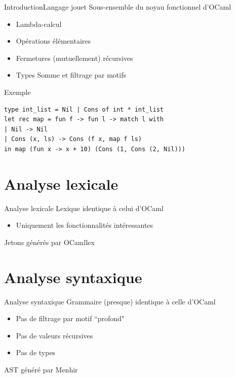 \documentclass{beamer}
\begin{document}
\begin{frame}[fragile]{Introduction}{Langage jouet}
    Sous-ensemble du noyau fonctionnel d'OCaml

    \begin{itemize}
        \item Lambda-calcul
        \item Opérations élémentaires
        \item Fermetures (mutuellement) récursives
        \item Types Somme et filtrage par motifs
    \end{itemize}

    \begin{exampleblock}{Exemple}
        \begin{lstlisting}[language=caml]
type int_list = Nil | Cons of int * int_list
let rec map = fun f -> fun l -> match l with
| Nil -> Nil
| Cons (x, ls) -> Cons (f x, map f ls)
in map (fun x -> x + 10) (Cons (1, Cons (2, Nil)))
        \end{lstlisting}
    \end{exampleblock}
\end{frame}

\section{Analyse lexicale}

\begin{frame}{Analyse lexicale}
    Lexique identique à celui d'OCaml

    \begin{itemize}
        \item Uniquement les fonctionnalités intéressantes
    \end{itemize}

    Jetons générés par OCamllex
\end{frame}

\section{Analyse syntaxique}

\begin{frame}{Analyse syntaxique}
    Grammaire (presque) identique à celle d'OCaml

    \begin{itemize}
        \item Pas de filtrage par motif ``profond"
        \item Pas de valeurs récursives
        \item Pas de types
    \end{itemize}

    AST généré par Menhir
\end{frame}
\end{document}
